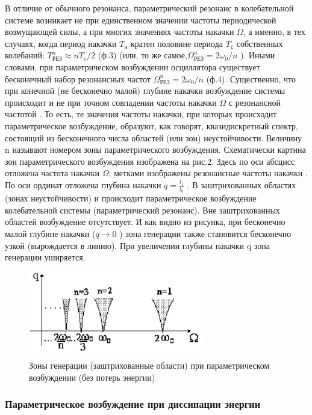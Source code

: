 \documentclass[a4paper,12pt]{article}
\begin{document}
В отличие от обычного резонанса, параметрический резонанс в колебательной системе возникает не при единственном значении  частоты периодической возмущающей силы, а  при многих значениях частоты накачки $\Omega$, а именно, в тех случаях, когда период накачки $T_н$  кратен половине периода $T_с$ собственных колебаний: $T^n_{РЕЗ} \approx nT_c/2$ (ф.3) (или, то же самое,$\Omega^n_{РЕЗ} = 2\omega_0/n$  ). Иными словами,  при параметрическом возбуждении  осциллятора  существует  бесконечный набор резонансных частот  $\Omega^n_{РЕЗ}=2\omega_0/n$ (ф.4). 
Существенно, что при конечной (не бесконечно малой) глубине накачки  возбуждение системы происходит и не при точном совпадении частоты накачки $\Omega$ с резонансной частотой  .  То есть, те значения частоты накачки,  при которых происходит  параметрическое возбуждение, образуют, как говорят, квазидискретный спектр, состоящий из бесконечного числа областей (или зон) неустойчивости. Величину n называют номером зоны параметрического возбуждения.  Схематически картина зон параметрического возбуждения изображена на рис.2. Здесь по оси абсцисс отложена частота накачки $\Omega$; метками изображены резонансные частоты накачки  . По оси ординат отложена глубина накачки $q = \frac{l_1}{l_0}$ . В заштрихованных областях (зонах неустойчивости)   и происходит  параметрическое возбуждение колебательной системы (параметрический резонанс). Вне заштрихованных областей возбуждение отсутствует. И как видно из рисунка, при бесконечно малой глубине накачки ($q \rightarrow 0$ ) зона генерации также становится бесконечно узкой (вырождается в линию). При увеличении глубины накачки q зона генерации уширяется.

\begin{figure}[h!]
	\begin{center}
	\includegraphics[scale=0.8]{fig2}
\caption{Зоны генерации (заштрихованные области) при параметрическом  \\ возбуждении (без потерь энергии)}
	\end{center}
\end{figure}

\newpage

\subsubsection*{Параметрическое возбуждение при диссипации энергии}
\end{document}
